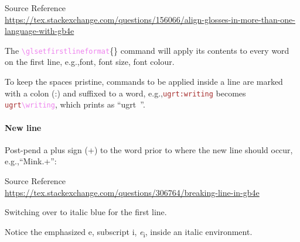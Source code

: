 \documentclass{article}
\newcommand\surl[1]{{\footnotesize\noindent Source Reference}\\\url{#1}}
\newcommand\writing{\ \textsym{🖉}}
\newcommand\emphe{\emph{e}}
\newcommand\subi{\textsubscript{i}}
\newcommand\para[1]{\bigskip\bigskip\paragraph{#1}}
\newcommand\glcmd[1]{\textcolor{violet}{\texttt{\textbackslash#1}}}
\newcommand\glcmdb[1]{\glcmd{#1}\{\}}
\newcommand\glmeta[1]{\textcolor{brown}{\texttt{#1}}}
\newcommand\eg{e.g.,\space}
\newcommand\squiggle{%
\begin{center}
{\usefont{U}{lasy}{m}{n}\char58\char58\char58\char58\char58\char58\char58\char58\char58}
\end{center}
}
\begin{document}
\begin{exe}
    \ex
{}
\end{exe}

\surl{https://tex.stackexchange.com/questions/156066/align-glosses-in-more-than-one-language-with-gb4e}


\squiggle



The \glcmdb{glsetfirstlineformat} command will apply its contents to every word on the first line, \eg	font, font size, font colour.

To keep the spaces pristine, commands to be applied inside a line are marked with a colon (:) and suffixed to a word, \eg \glmeta{ugrt:writing} becomes \glmeta{ugrt}\glcmd{writing}, which prints as ``ugrt\writing''.

\glsetfirstlineformat{\fug\large\color{blue}}
\begin{exe}
    \ex
{}
\end{exe}
\glsetfirstlineformat{}


\squiggle

\para{New line} Post-pend a plus sign (+) to the word prior to where the new line should occur, \eg ``Mink.+'':


\begin{exe}
        \ex
{}  
\end{exe}

\surl{https://tex.stackexchange.com/questions/306764/breaking-line-in-gb4e}


Switching over to italic blue for the first line.

Notice the emphasized e, subscript i, \emphe\subi, inside an italic environment.


\glsetfirstlineformat{\itshape\color{blue}}
\end{document}
